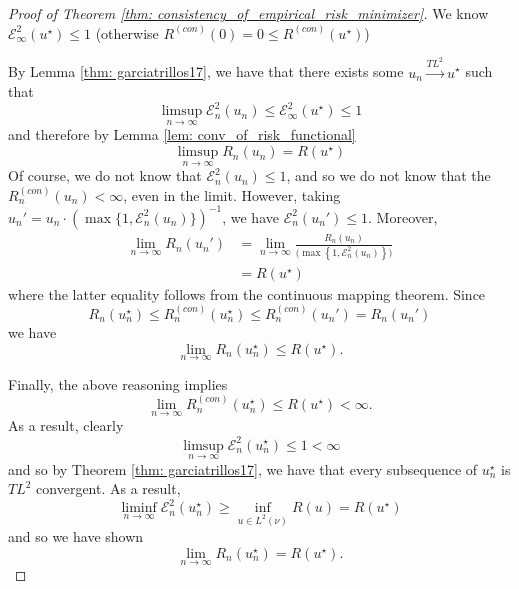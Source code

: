\documentclass{article}
\newcommand{\E}{\mathcal{E}}
\newcommand{\1}{\mathbf{1}}
\theoremstyle{alden}
\theoremstyle{aldenthm}
\theoremstyle{remark}
\begin{document}
\begin{proof}[Proof of Theorem \ref{thm: consistency_of_empirical_risk_minimizer}]
	We know $\E_{\infty}^2(u^{\star}) \leq 1$ (otherwise $R^{(con)}(0) = 0 \leq R^{(con)}(u^{\star})$)
	
	By Lemma \ref{thm: garciatrillos17}, we have that there exists some $u_n \overset{TL^2}{\to} u^{\star}$ such that
	\begin{equation*}
	\limsup_{n \to \infty} \E_n^2(u_n) \leq \E_{\infty}^2(u^{\star}) \leq 1
	\end{equation*}
	and therefore by Lemma \ref{lem: conv_of_risk_functional}
	\begin{equation*}
	\limsup_{n \to \infty} R_n(u_n) = R(u^{\star})
	\end{equation*}
	Of course, we do not know that $\E_n^2(u_n) \leq 1$, and so we do not know that the $R_n^{(con)}(u_n) < \infty$, even in the limit. However, taking $u_n' = u_n \cdot \left(\max\{1, \E_n^2(u_n) \}\right)^{-1}$, we have $\E_n^2(u_n') \leq 1$. Moreover,
	\begin{align}
	\label{eqn: theorem_consistency_1}
	\lim_{n \to \infty} R_n(u_n') & = \lim_{n \to \infty} \frac{R_n(u_n)}{\bigl(\max\left\{1, \E_n^2(u_n)\right\}\bigr)} \nonumber \\
	& = R(u^{\star})
	\end{align}
	where the latter equality follows from the continuous mapping theorem. 
	Since
	\begin{equation*}
	 R_n(u_n^{\star}) \leq R_n^{(con)}(u_n^{\star}) \leq R_n^{(con)}(u_n') = R_n(u_n')
	\end{equation*}
	we have
	\begin{equation*}
	\lim_{n \to \infty} R_n(u_n^{\star}) \leq R(u^{\star}).
	\end{equation*}
	
	Finally, the above reasoning implies
	\begin{equation*}
	\lim_{n \to \infty} R_n^{(con)}(u_n^{\star}) \leq R(u^{\star}) < \infty. 
	\end{equation*}
	As a result, clearly
	\begin{equation*}
	\limsup_{n \to \infty} \E_n^2(u_n^{\star}) \leq 1 < \infty 
	\end{equation*}
	and so by Theorem \ref{thm: garciatrillos17}, we have that every subsequence of $u_n^{\star}$ is $TL^2$ convergent. As a result, 
	\begin{equation*}
	\liminf_{n \to \infty} \E_n^2(u_n^{\star}) \geq \inf_{u \in L^2(\nu)} R(u) = R(u^{\star})
	\end{equation*}
	and so we have shown
	\begin{equation*}
	\lim_{n \to \infty} R_n(u_n^{\star}) = R(u^{\star}).
	\end{equation*}
\end{proof}
\end{document}
